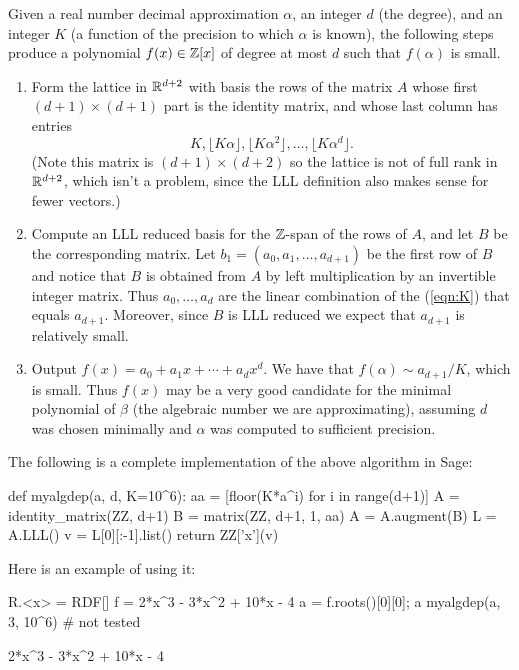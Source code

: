 Given a real number decimal approximation $\alpha$, an
integer $d$ (the degree), and an integer $K$ (a function
of the precision to which $\alpha$ is known), the following
steps produce a polynomial $f(x) \in \mathbb{Z}[x]$ of degree
at most $d$ such that $f(\alpha)$ is small.
\begin{enumerate}
	\item Form the lattice in $\mathbb{R}^{d+2}$ with basis the rows
	of the matrix $A$ whose first $(d+1) \times (d+1)$ part is the
	identity matrix, and whose last column has entries
	\begin{equation}\label{eqn:K}
		K, \lfloor K\alpha \rfloor, \lfloor K\alpha^2 \rfloor,
		\ldots, \lfloor K\alpha^{d} \rfloor.
	\end{equation}
	(Note this matrix is $(d+1) \times (d+2)$ so the lattice
	is not of full rank in $\mathbb{R}^{d+2}$, which isn't a problem,
	since the LLL definition also makes sense for fewer vectors.)

	\item Compute an LLL reduced basis for the $\mathbb{Z}$-span of the rows
	of $A$, and let $B$ be the corresponding matrix.
	Let $b_1 = (a_0, a_1, \ldots, a_{d+1})$ be the first
	row of $B$ and notice that $B$ is obtained from $A$
	by left multiplication by an invertible integer matrix.
	Thus $a_0,\ldots, a_d$ are the linear combination of the
	(\ref{eqn:K}) that equals $a_{d+1}$. Moreover, since $B$
	is LLL reduced we expect that $a_{d+1}$ is relatively small.

	\item Output $f(x) = a_0 + a_1 x + \cdots + a_{d} x^d$.
	We have that $f(\alpha) \sim a_{d+1}/K$, which is small.
	Thus $f(x)$ may be a very good candidate for the minimal
	polynomial of $\beta$ (the algebraic number we are approximating),
	assuming $d$ was chosen minimally and $\alpha$ was computed
	to sufficient precision.
\end{enumerate}

The following is a complete implementation of the above algorithm
in Sage:
\begin{sagecode}
\begin{sagecell}
def myalgdep(a, d, K=10^6):
    aa = [floor(K*a^i) for i in range(d+1)]
    A = identity_matrix(ZZ, d+1)
    B = matrix(ZZ, d+1, 1, aa)
    A = A.augment(B)
    L = A.LLL()
    v = L[0][:-1].list()
    return ZZ['x'](v)
\end{sagecell}
\end{sagecode}

Here is an example of using it:
\begin{sagecode}
\begin{sagecell}
R.<x> = RDF[]
f = 2*x^3 - 3*x^2 + 10*x - 4
a = f.roots()[0][0]; a
myalgdep(a, 3, 10^6)       # not tested
\end{sagecell}
\begin{sageout}
2*x^3 - 3*x^2 + 10*x - 4
\end{sageout}
\end{sagecode}


